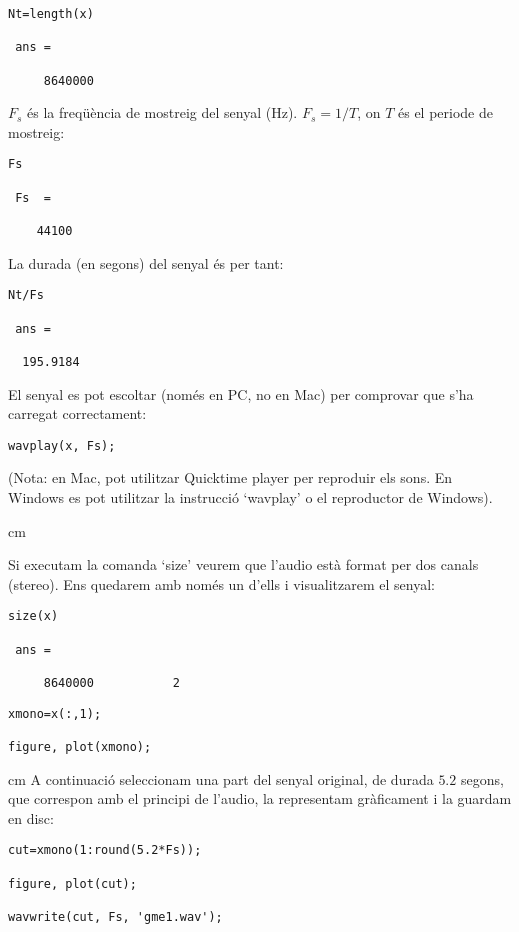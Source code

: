 \documentclass{article}
\begin{document}
\begin{verbatim}
Nt=length(x)

 ans =

     8640000
\end{verbatim}

$F_s$ és la freqüència de mostreig del senyal (Hz). $F_s=1/T$, on $T$ és el periode de mostreig:
\begin{verbatim}
Fs

 Fs  =
 
    44100 
\end{verbatim}

La durada (en segons) del senyal és per tant: 
\begin{verbatim}
Nt/Fs

 ans =

  195.9184
\end{verbatim}

El senyal es pot escoltar (només en PC, no en Mac) per comprovar que s'ha carregat correctament:

\begin{verbatim}
wavplay(x, Fs);

\end{verbatim}

(Nota: en Mac, pot utilitzar Quicktime player per reproduir els sons. En Windows es pot utilitzar la instrucció `wavplay' o el reproductor
de Windows).

 cm

Si executam la comanda `size' veurem que l'audio està format per dos canals (stereo). Ens quedarem amb només un d'ells i visualitzarem
el senyal:
\begin{verbatim}
size(x)

 ans =

     8640000           2
\end{verbatim}

\begin{verbatim}
xmono=x(:,1);

figure, plot(xmono);
\end{verbatim}


 cm
A continuació seleccionam una part del senyal original, de durada $5.2$ segons, que correspon amb el principi de l'audio,
la representam gràficament i la guardam en disc:
\begin{verbatim}
cut=xmono(1:round(5.2*Fs));

figure, plot(cut);

wavwrite(cut, Fs, 'gme1.wav');
\end{verbatim}
\end{document}
